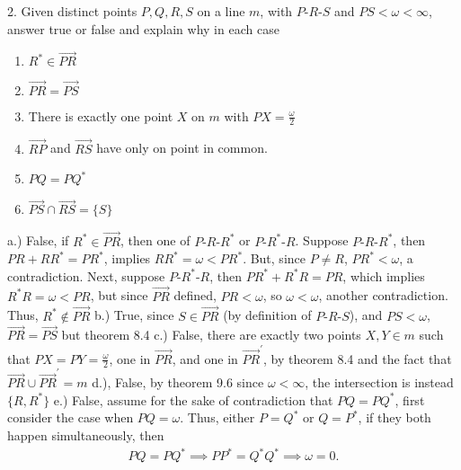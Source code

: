 \documentclass{report}
\begin{document}
    \pagebreak \bigbreak \noindent 
    \begin{mdframed}
        2. Given distinct points $P,Q,R,S$ on a line $m$, with $ P\text{-}R\text{-}S$ and $PS < \omega < \infty$, answer true or false and explain why in each case
        \begin{enumerate}[label=(\alph*)]
            \item $R^{*} \in \overrightarrow{PR} $
            \item $\overrightarrow{PR} = \overrightarrow{PS}$
            \item There is exactly one point $X$ on $m$ with $PX = \frac{\omega}{2}$
            \item $\overrightarrow{RP}$ and $\overrightarrow{RS}$ have only on point in common.
            \item $ PQ = PQ^* $
            \item $\overrightarrow{PS} \cap \overrightarrow{RS} = \{S\} $
        \end{enumerate}
    \end{mdframed}
    \bigbreak \noindent 
    a.) False, if $R^{*} \in \overrightarrow{PR}$, then one of $ P\text{-}R\text{-}R^{*}$ or $ P\text{-}R^{*}\text{-}R$. Suppose $ P\text{-}R\text{-}R^{*} $, then $PR + RR^{*} = PR^{*}$, implies $ RR^{*} = \omega < PR^{*}$. But, since $P \ne R$, $PR^{*} < \omega$, a contradiction. Next, suppose $ P\text{-}R^{*}\text{-}R$, then $ PR^{*} + R^{*}R = PR$, which implies $R^{*}R = \omega < PR$, but since $\overrightarrow{PR}$ defined, $PR < \omega$, so $\omega < \omega$, another contradiction. Thus, $R^{*} \not\in  \overrightarrow{PR}$
    \bigbreak \noindent 
    b.) True, since $S \in \overrightarrow{PR}$ (by definition of $ P\text{-}R\text{-}S$), and $PS < \omega$, $\overrightarrow{PR} = \overrightarrow{PS}$ but theorem 8.4
    \bigbreak \noindent 
    c.) False, there are exactly two points $X,Y \in m$ such that $PX = PY = \frac{\omega}{2} $, one in $\overrightarrow{PR}$, and one in $\overrightarrow{PR}^{\prime}$, by theorem 8.4 and the fact that $\overrightarrow{PR} \cup \overrightarrow{PR}^{\prime} = m $
    \bigbreak \noindent 
    d.), False, by theorem 9.6 since $\omega < \infty$, the intersection is instead $\{R,R^{*}\} $
    \bigbreak \noindent 
    e.) False, assume for the sake of contradiction that $PQ = PQ^{*}$, first consider the case when $PQ = \omega$. Thus, either $P = Q^{*} $ or $Q = P^{*}$, if they both happen simultaneously, then 
    \begin{align*}
        PQ = PQ^{*} \implies PP^{*} = Q^{*}Q^{*} \implies \omega = 0
    .\end{align*}
\end{document}
